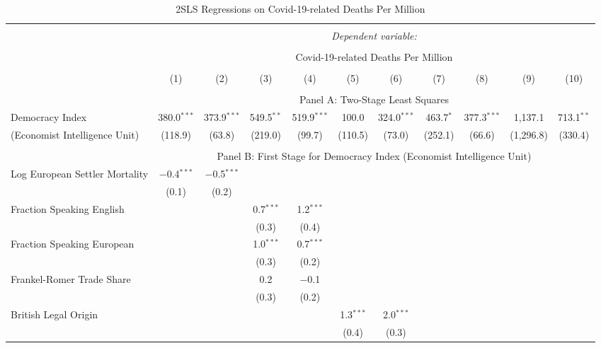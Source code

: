
\begin{table}[!htbp] 
  \caption{2SLS Regressions on Covid-19-related Deaths Per Million} \centering
  \label{tab:2sls-deaths-economist} 
  \footnotesize
  \begin{threeparttable}
\begin{tabular}{@{\extracolsep{0pt}}lcccccccccc} 
\\[-1.8ex]\hline 
\hline \\[-1.8ex] 
 & \multicolumn{10}{c}{\textit{Dependent variable:}} \\ 
\cline{2-11} 
\\[-1.8ex] & \multicolumn{10}{c}{Covid-19-related Deaths Per Million} \\ 
\\[-1.8ex] & (1) & (2) & (3) & (4) & (5) & (6) & (7) & (8) & (9) & (10)\\ 
\hline \\[-1.8ex] 
  & \multicolumn{10}{c}{Panel A: Two-Stage Least Squares} \\
 Democracy Index & 380.0$^{***}$ & 373.9$^{***}$ & 549.5$^{**}$ & 519.9$^{***}$ & 100.0 & 324.0$^{***}$ & 463.7$^{*}$ & 377.3$^{***}$ & 1,137.1 & 713.1$^{**}$ \\ 
 (Economist Intelligence Unit) & (118.9) & (63.8) & (219.0) & (99.7) & (110.5) & (73.0) & (252.1) & (66.6) & (1,296.8) & (330.4) \\ 
\hline \\[-1.8ex] 
   & \multicolumn{10}{c}{Panel B: First Stage for Democracy Index (Economist Intelligence Unit)} \\
  Log European Settler Mortality & $-$0.4$^{***}$ & $-$0.5$^{***}$ &  &  &  &  &  &  &  &  \\ 
  & (0.1) & (0.2) &  &  &  &  &  &  &  &  \\ 
  Fraction Speaking English &  &  & 0.7$^{***}$ & 1.2$^{***}$ &  &  &  &  &  &  \\ 
  &  &  & (0.3) & (0.4) &  &  &  &  &  &  \\ 
  Fraction Speaking European &  &  & 1.0$^{***}$ & 0.7$^{***}$ &  &  &  &  &  &  \\ 
  &  &  & (0.3) & (0.2) &  &  &  &  &  &  \\ 
  Frankel-Romer Trade Share &  &  & 0.2 & $-$0.1 &  &  &  &  &  &  \\ 
  &  &  & (0.3) & (0.2) &  &  &  &  &  &  \\ 
  British Legal Origin &  &  &  &  & 1.3$^{***}$ & 2.0$^{***}$ &  &  &  &  \\ 
  &  &  &  &  & (0.4) & (0.3) &  &  &  &  \\ 

\end{tabular}
\end{threeparttable}
\end{table}
